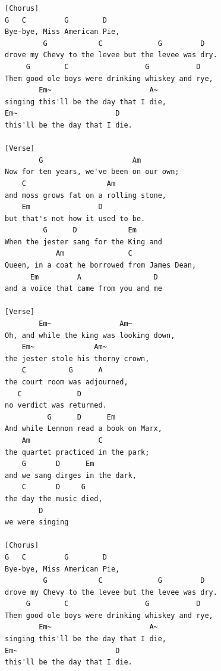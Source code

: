 \documentclass[../../../songbookMain]{subfiles}
\begin{document}
\begin{verbatim}
[Chorus]
G   C         G        D
Bye-bye, Miss American Pie,
         G            C             G         D
drove my Chevy to the levee but the levee was dry.
     G        C                  G           D
Them good ole boys were drinking whiskey and rye,
        Em~                       A~
singing this'll be the day that I die,
Em~                       D
this'll be the day that I die.
 
[Verse]
        G                     Am
Now for ten years, we've been on our own;
    C                   Am
and moss grows fat on a rolling stone,
    Em                D
but that's not how it used to be.
         G      D            Em
When the jester sang for the King and
            Am               C
Queen, in a coat he borrowed from James Dean,
      Em         A                 D
and a voice that came from you and me
 
[Verse]
        Em~                Am~
Oh, and while the king was looking down,
    Em~              Am~
the jester stole his thorny crown,
    C          G      A
the court room was adjourned,
   C             D
no verdict was returned.
          G      D      Em
And while Lennon read a book on Marx,
    Am                C
the quartet practiced in the park;
    G       D      Em
and we sang dirges in the dark,
    C       D     G
the day the music died,
        D
we were singing
 
[Chorus]
G   C         G        D
Bye-bye, Miss American Pie,
         G            C             G         D
drove my Chevy to the levee but the levee was dry.
     G        C                  G           D
Them good ole boys were drinking whiskey and rye,
        Em~                       A~
singing this'll be the day that I die,
Em~                       D
this'll be the day that I die.
\end{verbatim}
\end{document}
